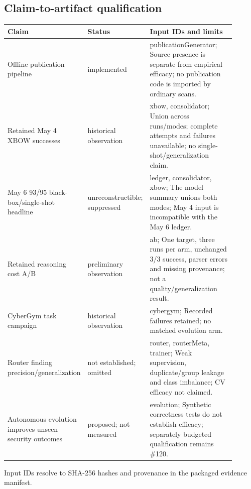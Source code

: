 \subsection{Claim-to-artifact qualification}
\begin{center}\small
\begin{tabular}{p{0.22\linewidth}p{0.22\linewidth}p{0.46\linewidth}}
\toprule
Claim & Status & Input IDs and limits \\
\midrule
Offline publication pipeline & implemented & publicationGenerator; Source presence is separate from empirical efficacy; no publication code is imported by ordinary scans. \\
Retained May 4 XBOW successes & historical observation & xbow, consolidator; Union across runs/modes; complete attempts and failures unavailable; no single-shot/generalization claim. \\
May 6 93/95 black-box/single-shot headline & unreconstructible; suppressed & ledger, consolidator, xbow; The model summary unions both modes; May 4 input is incompatible with the May 6 ledger. \\
Retained reasoning cost A/B & preliminary observation & ab; One target, three runs per arm, unchanged 3/3 success, parser errors and missing provenance; not a quality/generalization result. \\
CyberGym task campaign & historical observation & cybergym; Recorded failures retained; no matched evolution arm. \\
Router finding precision/generalization & not established; omitted & router, routerMeta, trainer; Weak supervision, duplicate/group leakage and class imbalance; CV efficacy not claimed. \\
Autonomous evolution improves unseen security outcomes & proposed; not measured & evolution; Synthetic correctness tests do not establish efficacy; separately budgeted qualification remains \#120. \\
\bottomrule
\end{tabular}
\end{center}
Input IDs resolve to SHA-256 hashes and provenance in the packaged evidence manifest.
